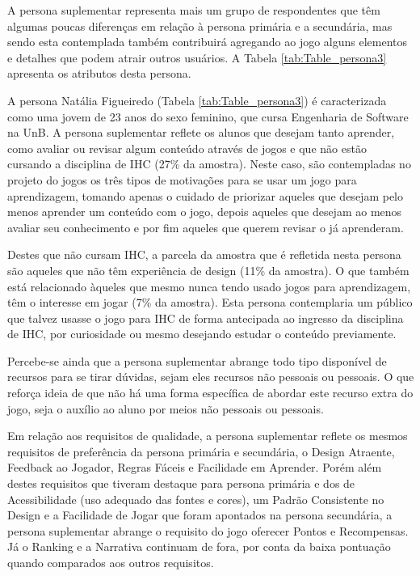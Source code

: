 A persona suplementar representa mais um grupo de respondentes que têm algumas poucas diferenças em relação à persona primária e a secundária, mas sendo esta contemplada também contribuirá agregando ao jogo alguns elementos e detalhes que podem atrair outros usuários. A Tabela \ref{tab:Table_persona3} apresenta os atributos desta persona.



A persona Natália Figueiredo (Tabela \ref{tab:Table_persona3}) é caracterizada como uma jovem de 23 anos do sexo feminino, que cursa Engenharia de Software na UnB. A persona suplementar reflete os alunos que desejam tanto aprender, como avaliar ou revisar algum conteúdo através de jogos e que não estão cursando a disciplina de IHC (27\% da amostra). Neste caso, são contempladas no projeto do jogos os três tipos de motivações para se usar um jogo para aprendizagem, tomando apenas o cuidado de priorizar aqueles que desejam pelo menos aprender um conteúdo com o jogo, depois aqueles que desejam ao menos avaliar seu conhecimento e por fim aqueles que querem revisar o já aprenderam.

Destes que não cursam IHC, a parcela da amostra que é refletida nesta persona são aqueles que não têm experiência de design (11\% da amostra). O que também está relacionado àqueles que mesmo nunca tendo usado jogos para aprendizagem, têm o interesse em jogar (7\% da amostra). Esta persona contemplaria um público que talvez usasse o jogo para IHC de forma antecipada ao ingresso da disciplina de IHC, por curiosidade ou mesmo desejando estudar o conteúdo previamente.

Percebe-se ainda que a persona suplementar abrange todo tipo disponível de recursos para se tirar dúvidas, sejam eles recursos não pessoais ou pessoais. O que reforça ideia de que não há uma forma específica de abordar este recurso extra do jogo, seja o auxílio ao aluno por meios não pessoais ou pessoais.

Em relação aos requisitos de qualidade, a persona suplementar reflete os mesmos requisitos de preferência da persona primária e secundária, o Design Atraente, Feedback ao Jogador, Regras Fáceis e Facilidade em Aprender. Porém além destes requisitos que tiveram destaque para persona primária e dos de Acessibilidade (uso adequado das fontes e cores), um Padrão Consistente no Design e a Facilidade de Jogar que foram apontados na persona secundária, a persona suplementar abrange o requisito do jogo oferecer Pontos e Recompensas. Já o Ranking e a Narrativa continuam de fora, por conta da baixa pontuação quando comparados aos outros requisitos.

